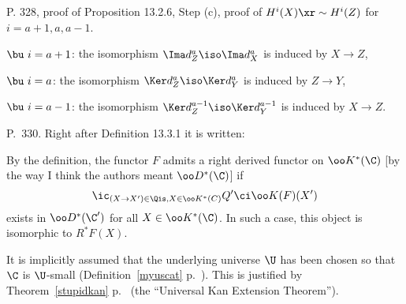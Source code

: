\documentclass[12pt]{article}
\theoremstyle{remark}
\theoremstyle{definition}
\begin{document}
%

\begin{s}
P. 328, proof of Proposition 13.2.6, Step (c), proof of $H^i(X)\xr\sim H^i(Z)$ for $i=a+1,a,a-1$. 

\nn$\bu\ i=a+1$: the isomorphism $\Ima d_Z^a\iso\Ima d_X^a$ is induced by $X\to Z$,

\nn$\bu\ i=a$: the isomorphism $\Ker d_Z^a\iso\Ker d_Y^a$ is induced by $Z\to Y$,

\nn$\bu\ i=a-1$: the isomorphism $\Ker d_Z^{a-1}\iso\Ker d_Y^{a-1}$ is induced by $X\to Z$.
\end{s}



\begin{s}
P.~330. Right after Definition 13.3.1 it is written: 

By the definition, the functor $F$ admits a right derived functor on $\oo K^*(\C)$ [by the way I think the authors meant $\oo D^*(\C)$] if 
$$
\ic_{(X\to X')\in\Qis,X\in\oo K^*(C)}Q'\ci\oo K(F)(X')
$$ 
exists in $\oo D^*(\C')$ for all $X\in\oo K^*(\C)$. In such a case, this object is isomorphic to $R^*F(X)$.

It is implicitly assumed that the underlying universe $\U$ has been chosen so that $\C$ is $\U$-small (Definition~\ref{myuscat} p.~). This is justified by Theorem~\ref{stupidkan} p.~ (the ``Universal Kan Extension Theorem''). 
\end{s}

%

\end{document}
